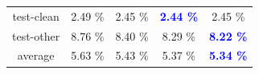 \documentclass{article}
\begin{document}
\begin{table}[!htbp]
\begin{tabular}{| c || c | c | c | c |}
              test-clean  &   2.49  \% & 2.45 \%  &  \textcolor{blue}{\bf 2.44 \%} & 2.45 \%  \\  
              test-other  &   8.76  \% & 8.40 \%  &   8.29 \%
              & \textcolor{blue}{\bf 8.22
              \%} \\
              average     &   5.63  \% & 5.43  \% &   5.37 \%
              & \textcolor{blue}{\bf 5.34 \%} \\
          \hline
       \end{tabular}
       \vspace{-2mm}
\end{table}
%
%
%
\end{document}
